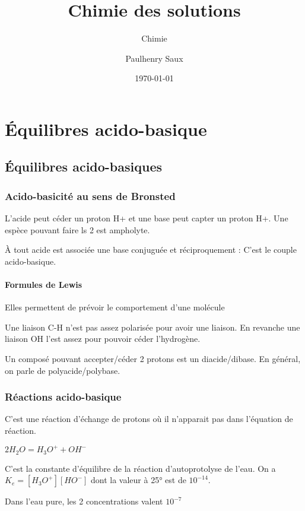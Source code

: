 \documentclass[french]{yLectureNote}
\title{Chimie des solutions}
\subtitle{Chimie}
\author{Paulhenry Saux}
\date{\today}
\begin{document}
\setcounter{chapter}{3}
\chapter{Équilibres acido-basique}
\section{Équilibres acido-basiques}
\subsection{Acido-basicité au sens de Bronsted}
\begin{definition}
L'acide peut céder un proton H+ et une base peut capter un proton H+. Une espèce pouvant faire ls 2 est ampholyte.
\end{definition}
À tout acide est associée une base conjuguée et réciproquement : C'est le couple acido-basique.


\subsubsection{Formules de Lewis}
Elles permettent de prévoir le comportement d'une molécule

Une liaison C-H n'est pas assez polarisée pour avoir une liaison. En revanche une liaison OH l'est assez pour pouvoir céder l'hydrogène.

Un composé pouvant accepter/céder 2 protons est un diacide/dibase. En général, on parle de polyacide/polybase.
\subsection{Réactions acido-basique}
C'est une réaction d'échange de protons où il n'apparait pas dans l'équation de réaction.

\begin{proposition}
\(2H_2O = H_3O^++OH^-\)
\end{proposition}
\begin{proposition}
C'est la constante d'équilibre de la réaction d'autoprotolyse de l'eau. On a \(K_e = [H_3O^+][HO^-]\) dont la valeur à 25° est de \(10^{-14}\).
\end{proposition}
Dans l'eau pure, les 2 concentrations valent \(10^{-7}\)
\end{document}
